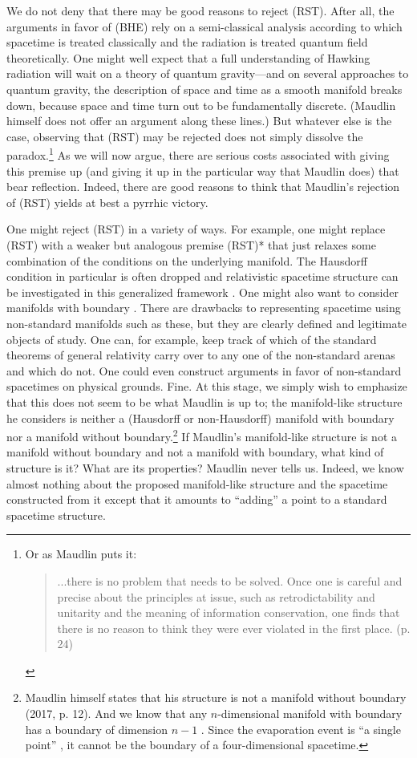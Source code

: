 \documentclass[authoryear,12pt,3p]{jowarticle}
\begin{document}
We do not deny that there may be good reasons to reject (RST).  After all, the arguments in favor of (BHE) rely on a semi-classical analysis according to which spacetime is treated classically and the radiation is treated quantum field theoretically.  One might well expect that a full understanding of Hawking radiation will wait on a theory of quantum gravity---and on several approaches to quantum gravity, the description of space and time as a smooth manifold breaks down, because space and time turn out to be fundamentally discrete.  (Maudlin himself does not offer an argument along these lines.)  But whatever else is the case, observing that (RST) may be rejected does not simply dissolve the paradox.\footnote{Or as Maudlin puts it: \begin{quote} ...there is no problem that needs to be solved. Once one is careful and precise about the	principles at issue, such as retrodictability and unitarity and the meaning of	information	conservation, one finds	that there is no reason	to think they were ever	violated in	the	first place. (p. 24)\end{quote}}  As we will now argue, there are serious costs associated with giving this premise up (and giving it up in the particular way that Maudlin does) that bear reflection.  Indeed, there are good reasons to think that Maudlin's rejection of (RST) yields at best a pyrrhic victory.

One might reject (RST) in a variety of ways. For example, one might replace (RST) with a weaker but analogous premise (RST)* that just relaxes some combination of the conditions on the underlying manifold.  The Hausdorff condition in particular is often dropped and relativistic spacetime structure can be investigated in this generalized framework \citep{Hajicek1971,Hawking+Ellis, Earman2008}. One might also want to consider manifolds with boundary \citep{Geroch+Horowitz}. There are drawbacks to representing spacetime using non-standard manifolds such as these, but they are clearly defined and legitimate objects of study. One can, for example, keep track of which of the standard theorems of general relativity carry over to any one of the non-standard arenas and which do not. One could even construct arguments in favor of non-standard spacetimes on physical grounds. Fine. At this stage, we simply wish to emphasize that this does not seem to be what Maudlin is up to; the manifold-like structure he considers is neither a (Hausdorff or non-Hausdorff) manifold with boundary nor a manifold without boundary.\footnote{Maudlin himself states that his structure is not a manifold without boundary (2017, p. 12). And we know that any $n$-dimensional manifold with boundary has a boundary of dimension $n-1$ \citep[p. 12]{Hawking+Ellis}. Since the evaporation event is ``a single point'' \citep[p. 20]{Maudlin}, it cannot be the boundary of a four-dimensional spacetime.} If Maudlin's manifold-like structure is not a manifold without boundary and not a manifold with boundary, what kind of structure is it? What are its properties? Maudlin never tells us. Indeed, we know almost nothing about the proposed manifold-like structure and the spacetime constructed from it except that it amounts to ``adding'' a point to a standard spacetime structure.
\end{document}
